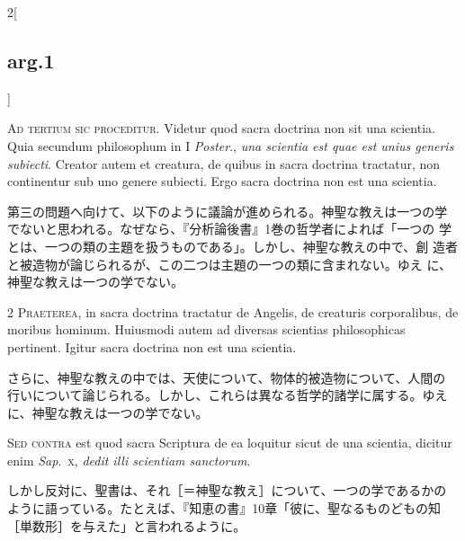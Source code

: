 \documentclass[
paper=a4paper,
fontsize=10pt,
jafontsize=9pt,
titlepage
]{jlreq}
\begin{document}
\begin{paracol}{2}[\subsection{arg.1}]

{\huge A}{\scshape d tertium sic proceditur}. Videtur quod sacra
doctrina non sit una scientia. Quia secundum philosophum in I {\itshape
Poster}., {\itshape una scientia est quae est unius generis
subiecti}. Creator autem et creatura, de quibus in sacra doctrina
tractatur, non continentur sub uno genere subiecti. Ergo sacra doctrina
non est una scientia.

\switchcolumn

第三の問題へ向けて、以下のように議論が進められる。神聖な教えは一つの学
でないと思われる。なぜなら、『分析論後書』1巻の哲学者によれば「一つの
学とは、一つの類の主題を扱うものである」。しかし、神聖な教えの中で、創
造者と被造物が論じられるが、この二つは主題の一つの類に含まれない。ゆえ
に、神聖な教えは一つの学でない。


{\scshape 2 Praeterea}, in sacra doctrina tractatur de Angelis, de
creaturis corporalibus, de moribus hominum. Huiusmodi autem ad
diversas scientias philosophicas pertinent. Igitur sacra doctrina non
est una scientia.

\switchcolumn

さらに、神聖な教えの中では、天使について、物体的被造物について、人間の
行いについて論じられる。しかし、これらは異なる哲学的諸学に属する。ゆえ
に、神聖な教えは一つの学でない。

\switchcolumn*[\subsection{s.c.}]

{\scshape Sed contra} est quod sacra Scriptura de ea loquitur sicut de
una scientia, dicitur enim {\itshape Sap}.~{\scshape x}, {\itshape dedit
illi scientiam sanctorum}.

\switchcolumn

しかし反対に、聖書は、それ［＝神聖な教え］について、一つの学であるかの
ように語っている。たとえば、『知恵の書』10章「彼に、聖なるものどもの知
［単数形］を与えた」と言われるように。



\end{paracol}
\end{document}
